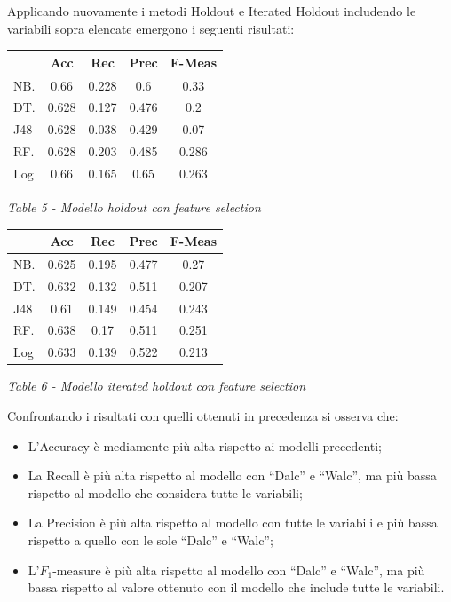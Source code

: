 \documentclass[12pt,a4paper]{report}
\begin{document}
\begin{multicols}{2}
Applicando nuovamente i metodi Holdout e Iterated Holdout includendo le variabili sopra elencate emergono i seguenti risultati:
\begin{center}
	\begin{tabular}{|>{\centering\arraybackslash}m{1cm}|c|c|c|c|}
		\hline
		& Acc & Rec & Prec & F-Meas \\
		\hline
		NB. & 0.66 & 0.228 & 0.6 &0.33
		\\
		\hline
		DT. & 0.628 & 0.127 & 0.476 & 0.2 \\
		\hline
		J48 & 0.628 & 0.038 & 0.429 & 0.07 \\
		\hline
		RF. & 0.628 & 0.203 &  0.485 &0.286 \\
		\hline
		Log & 0.66 & 0.165 & 0.65
		& 0.263\\
		\hline
	\end{tabular}
\end{center}
\begin{center}
	\textit{Table 5 - Modello holdout con feature selection}
\end{center}
\begin{center}
	\begin{tabular}{|>{\centering\arraybackslash}m{1cm}|c|c|c|c|}
		\hline
		& Acc & Rec & Prec & F-Meas \\
		\hline
		NB. & 0.625 & 0.195 & 0.477 &0.27
		\\
		\hline
		DT. & 0.632  & 0.132 & 0.511 & 0.207 \\
		\hline
		J48 & 0.61 & 0.149 & 0.454 & 0.243 \\
		\hline
		RF. & 0.638 & 0.17 &  0.511 & 0.251 \\
		\hline
		Log & 0.633 & 0.139 & 0.522
		&  0.213\\
		\hline
	\end{tabular}
\end{center}
\begin{center}
	\textit{Table 6 - Modello iterated holdout con feature selection}
\end{center}
Confrontando i risultati con quelli ottenuti in precedenza si osserva che:
\begin{itemize}
	\item L'Accuracy è mediamente più alta rispetto ai modelli precedenti;
	\item La Recall è più alta rispetto al modello con “Dalc” e “Walc”, ma più bassa rispetto al modello che considera tutte le variabili;
	\item La Precision è più alta rispetto al modello con tutte le variabili e più bassa rispetto a quello con le sole “Dalc” e “Walc”;
	\item L'$F_1$-measure è più alta rispetto al modello con “Dalc” e “Walc”, ma più bassa rispetto al valore ottenuto con il modello che include tutte le variabili.
\end{itemize}


\end{multicols}
\end{document}
